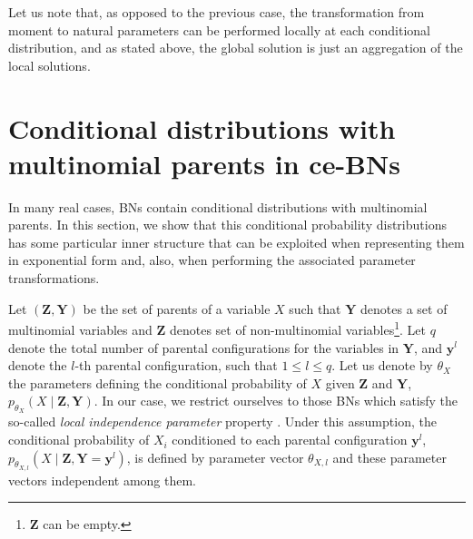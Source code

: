 \documentclass[11pt, oneside]{article}   	%
\newcommand{\bm}{\mathbf}
\numberwithin{figure}{section}
\numberwithin{equation}{section}
\numberwithin{table}{section}
\theoremstyle{definition}
\begin{document}
Let us note that, as opposed to the previous case, the transformation from moment to natural parameters can be performed locally at each conditional distribution, and as stated above, the global solution is just an aggregation of the local solutions.




\section{Conditional distributions with multinomial parents in ce-BNs}\label{Section:CD_With_MParents}

In many real cases, BNs contain conditional distributions with multinomial parents. In this section, we show that this conditional probability distributions has some particular inner structure that can be exploited when representing them in  exponential form and, also, when performing the associated parameter transformations.  

Let $(\bm Z, \bm Y)$ be the set of parents of a variable $X$ such that $\mathbf{Y}$ denotes a set of multinomial variables and $\bm Z$ denotes set of non-multinomial variables\footnote{$\bm Z$ can be empty.}.  Let $q$ denote the total number of parental configurations for the variables in $\bm Y$, and $\mathbf{y}^l$ denote the $l$-th parental configuration, such that $1 \leq l \leq q$. Let us denote by $\theta_X$ the parameters defining the conditional probability of $X$ given $\bm Z$ and $\bm Y$,  $p_{\theta_X}(X \mid \bm Z, \bm Y)$.  In our case, we restrict ourselves to those BNs which satisfy the so-called \emph{local independence parameter} property \cite{heckerman1995learning}. Under this assumption, the conditional probability of $X_i$ conditioned to each parental configuration $\mathbf{y}^l$, $p_{\theta_{X,l}}(X \mid \bm Z, \bm Y = \bm y^l)$,  is defined by parameter vector $\theta_{X,l}$ and these parameter vectors independent among them. 
\end{document}
